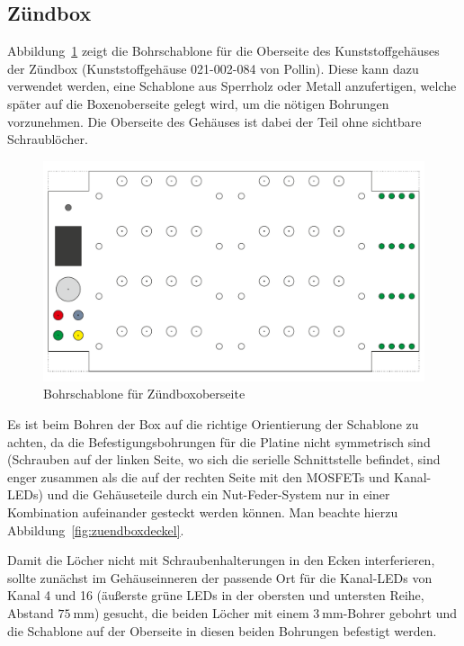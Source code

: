 \documentclass[paper=a4, parskip, numbers=noenddot, toc=listof, headsepline]{scrbook}
\begin{document}
			\subsection{Zündbox}
				Abbildung~\ref{fig:zuendboxbohren} zeigt die Bohrschablone für die Oberseite des Kunststoffgehäuses der Zündbox (Kunststoffgehäuse 021-002-084 von Pollin). Diese kann dazu verwendet werden, eine Schablone aus Sperrholz oder Metall anzufertigen, welche später auf die Boxenoberseite gelegt wird, um die nötigen Bohrungen vorzunehmen. Die Oberseite des Gehäuses ist dabei der Teil ohne sichtbare Schraublöcher.

				\begin{figure}
					\centering
					\includegraphics[angle=90,scale=1]{Bilder/Zuendboxbohrschablone}
					\caption{Bohrschablone für Zündboxoberseite}
					\label{fig:zuendboxbohren}
				\end{figure}

				Es ist beim Bohren der Box auf die richtige Orientierung der Schablone zu achten, da die Befestigungsbohrungen für die Platine nicht symmetrisch sind (Schrauben auf der linken Seite, wo sich die serielle Schnittstelle befindet, sind enger zusammen als die auf der rechten Seite mit den MOSFETs und Kanal-LEDs) und die Gehäuseteile durch ein Nut-Feder-System nur in einer Kombination aufeinander gesteckt werden können. Man beachte hierzu Abbildung~\ref{fig:zuendboxdeckel}.

				Damit die Löcher nicht mit Schraubenhalterungen in den Ecken interferieren, sollte zunächst im Gehäuseinneren der passende Ort für die Kanal-LEDs von Kanal 4 und 16 (äußerste grüne LEDs in der obersten und untersten Reihe, Abstand $\SI{75}{\milli\metre}$) gesucht, die beiden Löcher mit einem $\SI{3}{\milli\metre}$-Bohrer gebohrt und die Schablone auf der Oberseite in diesen beiden Bohrungen befestigt werden.
\end{document}
